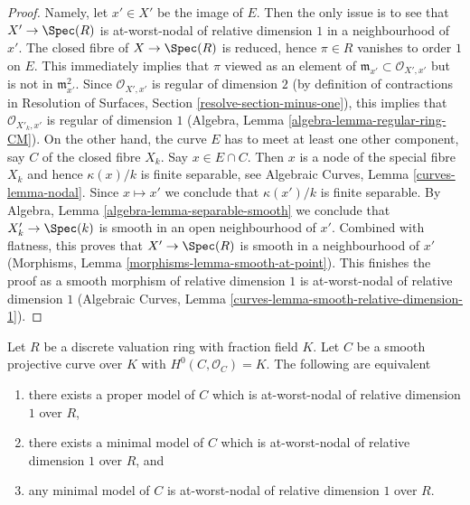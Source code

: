 \begin{proof}
Namely, let $x' \in X'$ be the image of $E$.
Then the only issue is to see that $X' \to \Spec(R)$
is at-worst-nodal of relative dimension $1$
in a neighbourhood of $x'$.
The closed fibre of $X \to \Spec(R)$ is reduced, hence
$\pi \in R$ vanishes to order $1$ on $E$.
This immediately implies that
$\pi$ viewed as an element of
$\mathfrak m_{x'} \subset \mathcal{O}_{X', x'}$ but
is not in $\mathfrak m_{x'}^2$.
Since $\mathcal{O}_{X', x'}$ is regular of
dimension $2$ (by definition of contractions in
Resolution of Surfaces, Section \ref{resolve-section-minus-one}),
this implies that $\mathcal{O}_{X'_k, x'}$
is regular of dimension $1$
(Algebra, Lemma \ref{algebra-lemma-regular-ring-CM}).
On the other hand, the curve $E$ has to meet at
least one other component, say $C$ of the closed fibre $X_k$.
Say $x \in E \cap C$. Then $x$ is a node of the special
fibre $X_k$ and hence $\kappa(x)/k$ is finite separable,
see Algebraic Curves, Lemma \ref{curves-lemma-nodal}.
Since $x \mapsto x'$ we conclude that $\kappa(x')/k$
is finite separable.
By Algebra, Lemma \ref{algebra-lemma-separable-smooth}
we conclude that $X'_k \to \Spec(k)$ is smooth
in an open neighbourhood of $x'$.
Combined with flatness, this proves that
$X' \to \Spec(R)$ is smooth in a neighbourhood of $x'$
(Morphisms, Lemma \ref{morphisms-lemma-smooth-at-point}).
This finishes the proof as a smooth morphism of
relative dimension $1$ is at-worst-nodal of relative
dimension $1$
(Algebraic Curves, Lemma \ref{curves-lemma-smooth-relative-dimension-1}).
\end{proof}

\begin{lemma}
\label{lemma-semistable}
Let $R$ be a discrete valuation ring with fraction field $K$.
Let $C$ be a smooth projective curve over $K$ with $H^0(C, \mathcal{O}_C) = K$.
The following are equivalent
\begin{enumerate}
\item there exists a proper model of $C$ which is
at-worst-nodal of relative dimension $1$ over $R$,
\item there exists a minimal model of $C$ which is at-worst-nodal
of relative dimension $1$ over $R$, and
\item any minimal model of $C$ is at-worst-nodal
of relative dimension $1$ over $R$.
\end{enumerate}
\end{lemma}

